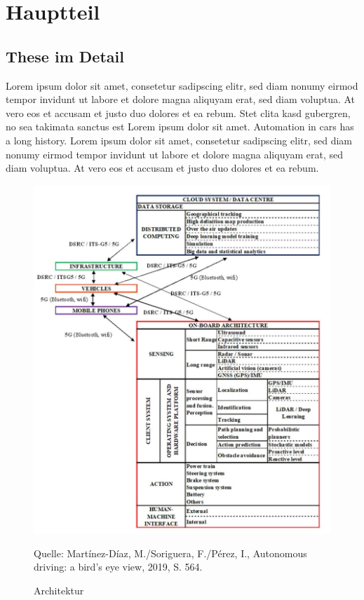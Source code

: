 \chapter{Hauptteil}


	      	      	      	      	      
	      	      	      	      	      
	      	      	      	      	      
\section{These im Detail}
	      	      	      	      	      
Lorem ipsum dolor sit amet, consetetur sadipscing elitr, sed diam nonumy eirmod tempor invidunt ut labore et dolore magna aliquyam erat, sed diam voluptua. 
At vero eos et accusam et justo duo dolores et ea rebum. 
Stet clita kasd gubergren, no sea takimata sanctus est Lorem ipsum dolor sit amet. 
Automation in cars has a long history.  Lorem ipsum dolor sit amet, consetetur sadipscing elitr, sed diam nonumy eirmod tempor invidunt ut labore et dolore magna aliquyam erat, sed diam voluptua. 
At vero eos et accusam et justo duo dolores et ea rebum.
\newline 
	      	      	      	      	      
	      	      	      	      	      
\begin{figure}
	\caption[Architektur]{Architektur}
	\centering
	\includegraphics[]{assets/figures/Architektur.jpg}
	\begin{flushleft}
		Quelle: Martínez-Díaz, M./Soriguera, F./Pérez, I., Autonomous driving: a bird's eye view, 2019, S. 564.	
	\end{flushleft}														
\end{figure}
	      	      	      	      	      
